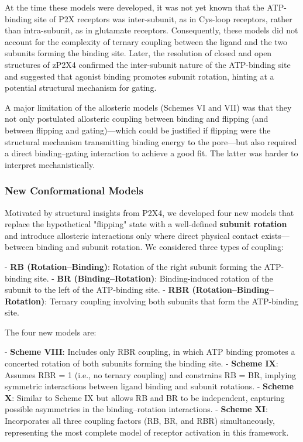 \documentclass[pdflatex,sn-mathphys-num]{sn-jnl}%
\theoremstyle{thmstyleone}%
\theoremstyle{thmstyletwo}%
\theoremstyle{thmstylethree}%
\begin{document}
At the time these models were developed, it was not yet known that the ATP-binding site of P2X receptors was inter-subunit, as in Cys-loop receptors, rather than intra-subunit, as in glutamate receptors. Consequently, these models did not account for the complexity of ternary coupling between the ligand and the two subunits forming the binding site. Later, the resolution of closed and open structures of zP2X4 \cite{cerrada_p2x, abierta_p2x} confirmed the inter-subunit nature of the ATP-binding site and suggested that agonist binding promotes subunit rotation, hinting at a potential structural mechanism for gating.

A major limitation of the allosteric models (Schemes VI and VII) was that they not only postulated allosteric coupling between binding and flipping (and between flipping and gating)—which could be justified if flipping were the structural mechanism transmitting binding energy to the pore—but also required a direct binding–gating interaction to achieve a good fit. The latter was harder to interpret mechanistically. 

\subsubsection{New Conformational Models}

Motivated by structural insights from P2X4, we developed four new models that replace the hypothetical "flipping" state with a well-defined \textbf{subunit rotation} and introduce allosteric interactions only where direct physical contact exists—between binding and subunit rotation. We considered three types of coupling:

- \textbf{RB (Rotation–Binding)}: Rotation of the right subunit forming the ATP-binding site.  
- \textbf{BR (Binding–Rotation)}: Binding-induced rotation of the subunit to the left of the ATP-binding site.  
- \textbf{RBR (Rotation–Binding–Rotation)}: Ternary coupling involving both subunits that form the ATP-binding site.  

The four new models are:

- \textbf{Scheme VIII}: Includes only RBR coupling, in which ATP binding promotes a concerted rotation of both subunits forming the binding site.  
- \textbf{Scheme IX}: Assumes RBR = 1 (i.e., no ternary coupling) and constrains RB = BR, implying symmetric interactions between ligand binding and subunit rotations.  
- \textbf{Scheme X}: Similar to Scheme IX but allows RB and BR to be independent, capturing possible asymmetries in the binding–rotation interactions.  
- \textbf{Scheme XI}: Incorporates all three coupling factors (RB, BR, and RBR) simultaneously, representing the most complete model of receptor activation in this framework.  
\end{document}

